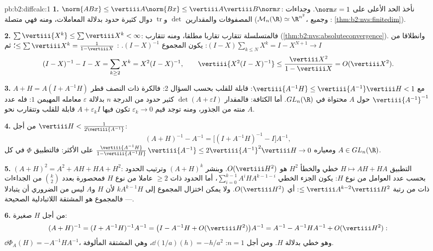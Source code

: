 \begin{solution}{pb:b2:diffcalc:1}
\textbf{1.} $\norm{ABx} \leq \vertiii A\norm{Bx} \leq
\vertiii A\vertiii B\norm x$: نأخذ الحد الأعلى على $\norm x = 1$.
وجداءات المصفوفات والمقدارين $\det$ و$\operatorname{tr}$ دوال كثيرة حدود بدلالة
المعاملات، ومنه فهي متصلة ($\mathcal M_n(\R)
\simeq \R^{n^2}$، وجميع :
\cref{thm:b2:nvs:finitedim}).

\textbf{2.} $\sum\vertiii{X^k} \leq \sum\vertiii X^k <
\infty$: فالمتسلسلة تتقارب تقاربا مطلقا، ومنه تتقارب
(\cref{thm:b2:nvs:absoluteconvergence}). وانطلاقا من $(I -
X)\sum_{k\leq N}X^k = I - X^{N+1} \to I$: يكون المجموع $(I -
X)^{-1}$. : $\leq \sum\vertiii X^k = \frac{1}{1 -
\vertiii X}$؛ ثم
\[
(I - X)^{-1} - I - X = \sum_{k\geq2}X^k = X^2(I - X)^{-1},
\qquad
\vertiii{X^2(I-X)^{-1}} \leq
\frac{\vertiii X^2}{1 - \vertiii X} = O(\vertiii X^2).
\]

\textbf{3.} $A + H = A(I + A^{-1}H)$ مع $\vertiii{A^{-1}H}
\leq \vertiii{A^{-1}}\vertiii H < 1$: قابلة للقلب بحسب السؤال 2:
فالكرة  ذات النصف قطر $\vertiii{A^{-1}}^{-1}$ حول $A$ محتواة
في $GL_n(\R)$. أما الكثافة: فالمقدار $\det(A + \varepsilon I)$ كثير حدود من الدرجة $n$
بدلالة $\varepsilon$ معامله المهيمن $1$: فله عدد منته من الجذور، ومنه
توجد قيم $\varepsilon_k \to 0$ تكون فيها $A + \varepsilon_kI$ قابلة للقلب وتتقارب نحو $A$.

\textbf{4.} من أجل $\vertiii H < \frac{1}{2\vertiii{A^{-1}}}$:
\[
(A + H)^{-1} - A^{-1}
= \bigl[(I + A^{-1}H)^{-1} - I\bigr]A^{-1},
\]
ومعياره $\frac{\vertiii{A^{-1}H}}{1 -
\vertiii{A^{-1}H}}\,\vertiii{A^{-1}} \leq
2\vertiii{A^{-1}}^2\vertiii H \to 0$ على الأكثر: فالتطبيق $\Phi$  في
كل $A \in GL_n(\R)$.

\textbf{5.} $(A+H)^2 = A^2 + AH + HA + H^2$: التطبيق $H
\mapsto AH + HA$ خطي والخطأ $H^2$ هو
$O(\vertiii H^2)$. وبنشر $(A + H)^k$ وترتيب الحدود بحسب عدد العوامل من نوع $H$:
يكون الجزء الخطي $\sum_{i=0}^{k-1}A^iHA^{k-1-i}$، أما الحدود ذات $\geq 2$
عاملا من نوع $H$ فمحصورة بعدد $\binom k2$ من الجداءات ذات  من
رتبة $\leq \vertiii A^{k-2}\vertiii H^2$: أي $O(\vertiii H^2)$.
ولا يمكن اختزال المجموع إلى $kA^{k-1}H$ لأن $H$ و$A$ ليس من الضروري
أن يتبادلا --- فالمجموع هو المشتقة اللاتبادلية الصحيحة.

\textbf{6.} من أجل $H$ صغيرة:
\[
(A+H)^{-1} = (I + A^{-1}H)^{-1}A^{-1}
= \bigl(I - A^{-1}H + O(\vertiii H^2)\bigr)A^{-1}
= A^{-1} - A^{-1}HA^{-1} + O(\vertiii H^2) :
\]
$\dd\Phi_A(H) = -A^{-1}HA^{-1}$، وهو خطي بدلالة $H$. ومن أجل $n = 1$:
$\dd(1/a)(h) = -h/a^2$، وهي المشتقة المألوفة.


\end{solution}

